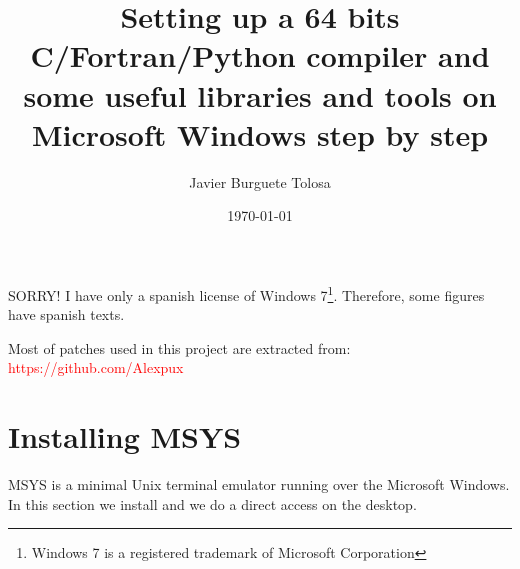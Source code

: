 \documentclass[a4paper]{article}
\title{Setting up a 64 bits C/Fortran/Python compiler and some useful libraries
and tools on Microsoft Windows step by step}
\author{Javier Burguete Tolosa}
\date{\today}
\newcommand{\RED}[1] {\textcolor{red}{#1}}
\begin{document}
\maketitle

\tableofcontents

\section*{}

SORRY! I have only a spanish license of Windows 7\footnote{Windows 7 is a
registered trademark of Microsoft Corporation}. Therefore, some figures have
spanish texts.

Most of patches used in this project are extracted from:\\
\RED{https://github.com/Alexpux}

\clearpage

\section{Installing MSYS}

MSYS is a minimal Unix terminal emulator running over the Microsoft Windows. In
this section we install and we do a direct access on the desktop.
\end{document}
